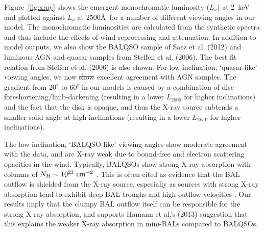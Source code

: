 \documentclass[useAMS,usenatbib]{mn2e_x}
\providecommand{\DIFadd}[1]{{\protect\color{blue}\uwave{#1}}} %
\providecommand{\DIFdel}[1]{{\protect\color{red}\sout{#1}}}                      %
\providecommand{\DIFaddbegin}{} %
\providecommand{\DIFaddend}{} %
\providecommand{\DIFdelbegin}{} %
\providecommand{\DIFdelend}{} %
\begin{document}
\DIFaddend Figure~\ref{fig:xray} shows the emergent
monochromatic luminosity ($L_\nu$) at 2~keV and 
plotted against $L_\nu$ at $2500$\AA\ for a number of different viewing angles in our model.
The monochromatic luminosities are calculated from the synthetic spectra and thus include
the effects of wind reprocessing and attenuation. In addition to model outputs,
we also show the BALQSO sample of Saez et al. (2012) and luminous AGN and quasar
samples from Steffen et al. (2006). The best fit relation from Steffen et al. (2006) 
is also shown. For low inclination, `quasar-like' viewing angles,
we now \DIFdelbegin \DIFdel{show }\DIFdelend \DIFaddbegin \DIFadd{find }\DIFaddend excellent agreement with AGN samples. The gradient from $20^\circ$ to
$60^\circ$ in our models is caused by a combination of disc foreshortening/limb-darkening 
(resulting in a lower $L_{2500}$ for higher inclinations) and the fact that the disk 
is opaque, and thus the X-ray source subtends a smaller solid angle at high inclinations
(resulting in a lower $L_{2keV}$ for higher inclinations). 



The low inclination, `BALQSO-like' viewing angles show moderate agreement with the data,
and are X-ray weak due to bound-free and electron scattering opacities in the wind.
Typically, BALQSOs show strong X-ray absorption with columns 
of $N_H\sim10^{23}~\rm{cm^{-2}}$ 
\citep{green1996,mathur2000,green2001,grupemathur2003}.
This is often cited as evidence that the BAL outflow is shielded from
the X-ray source, especially as sources with strong X-ray absorption tend
to exhibit deep BAL troughs and high outflow velocities 
\citep{brandt2000,laorbrandt2002,gallagher2006}.
Our results imply that the clumpy BAL outflow
itself can be responsible for the strong X-ray absorption, 
and supports Hamann et al.'s (2013) suggestion that 
this explains the weaker X-ray absorption in mini-BALs 
compared to BALQSOs.
\end{document}
